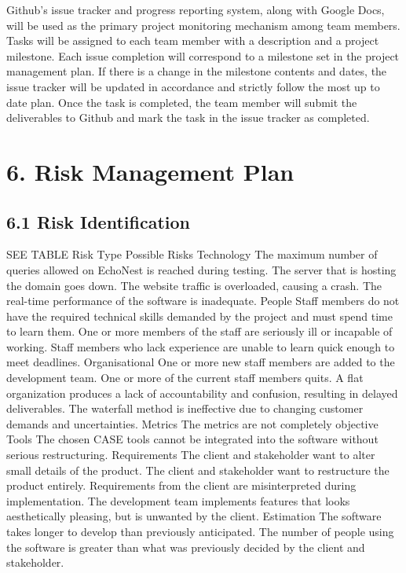 \documentclass[]{article}
\begin{document}
Github's issue tracker and progress reporting system, along with Google
Docs, will be used as the primary project monitoring mechanism among
team members. Tasks will be assigned to each team member with a
description and a project milestone. Each issue completion will
correspond to a milestone set in the project management plan. If there
is a change in the milestone contents and dates, the issue tracker will
be updated in accordance and strictly follow the most up to date plan.
Once the task is completed, the team member will submit the deliverables
to Github and mark the task in the issue tracker as completed.

\section{6. Risk Management Plan}\label{risk-management-plan}

\subsection{6.1 Risk Identification}\label{risk-identification}

SEE TABLE Risk Type Possible Risks Technology The maximum number of
queries allowed on EchoNest is reached during testing. The server that
is hosting the domain goes down. The website traffic is overloaded,
causing a crash. The real-time performance of the software is
inadequate. People Staff members do not have the required technical
skills demanded by the project and must spend time to learn them. One or
more members of the staff are seriously ill or incapable of working.
Staff members who lack experience are unable to learn quick enough to
meet deadlines. Organisational One or more new staff members are added
to the development team. One or more of the current staff members quits.
A flat organization produces a lack of accountability and confusion,
resulting in delayed deliverables. The waterfall method is ineffective
due to changing customer demands and uncertainties. Metrics The metrics
are not completely objective Tools The chosen CASE tools cannot be
integrated into the software without serious restructuring. Requirements
The client and stakeholder want to alter small details of the product.
The client and stakeholder want to restructure the product entirely.
Requirements from the client are misinterpreted during implementation.
The development team implements features that looks aesthetically
pleasing, but is unwanted by the client. Estimation The software takes
longer to develop than previously anticipated. The number of people
using the software is greater than what was previously decided by the
client and stakeholder.
\end{document}
